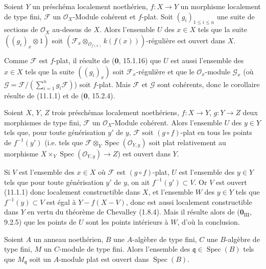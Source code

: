 \begin{corollary}[11.1.4]
\label{IV.11.1.4-fr}
Soient $Y$ un préschéma localement noethérien, $f:X\to Y$ un morphisme
localement de type fini, $\mathcal F$ un $\mathcal O_X$-Module cohérent et
$f$-plat. Soit $(g_i)_{1\leq i\leq n}$ une suite de sections de $\mathcal O_X$
au-dessus de $X$. Alors l'ensemble $U$ des $x\in X$ tels que la suite
$((g_i)_x\otimes1)$ soit
$(\mathcal F_x\otimes_{\mathcal O_{f(x)}}k(f(x)))$-régulière est ouvert dans
$X$.
\end{corollary}


Comme $\mathcal F$ est $f$-plat, il résulte de ($\mathbf 0$, 15.1.16) que $U$
est aussi l'ensemble des $x\in X$ tels que la suite $((g_i)_x)$ soit
$\mathcal F_x$-régulière et que le $\mathcal O_x$-module $\mathcal G_x$ (où
$\mathcal G=\mathcal F/(\sum_{i=1}^n g_i\mathcal F)$) soit $f$-plat. Mais
$\mathcal F$ et $\mathcal G$ sont cohérents, donc le corollaire résulte de
(11.1.1) et de ($\mathbf 0$, 15.2.4).

\begin{corollary}[11.1.5]
\label{IV.11.1.5-fr}
Soient $X$, $Y$, $Z$ trois préschémas localement noethériens,
$f:X\to Y$, $g:Y\to Z$ deux morphismes de type fini, $\mathcal F$ un
$\mathcal O_X$-Module cohérent. Alors l'ensemble $U$ des $y\in Y$ tels que,
pour toute générisation $y'$ de $y$, $\mathcal F$ soit $(g\circ f)$-plat en
tous les points de $f^{-1}(y')$ (i.e. tels que
$\mathcal F\otimes_Y\operatorname{Spec}(\mathcal O_{Y,y})$ soit plat
relativement au morphisme
$X\times_Y\operatorname{Spec}(\mathcal O_{Y,y})\to Z$) est ouvert dans $Y$.
\end{corollary}

Si $V$ est l'ensemble des $x\in X$ où $\mathcal F$ est $(g\circ f)$-plat, $U$
est l'ensemble des $y\in Y$ tels que pour toute générisation $y'$ de $y$, on
ait $f^{-1}(y')\subset V$. Or $V$ est ouvert (11.1.1) donc localement
constructible dans $X$, et l'ensemble $W$ des $y\in Y$ tels que
$f^{-1}(y)\subset V$ est égal à $Y-f(X-V)$, donc est aussi localement
constructible dans $Y$ en vertu du théorème de Chevalley (1.8.4). Mais il
résulte alors de ($\mathbf 0_{\mathrm{III}}$, 9.2.5) que les points de $U$ sont
les points intérieurs à $W$, d'où la conclusion.

\begin{corollary}[11.1.6]
\label{IV.11.1.6-fr}
Soient $A$ un anneau noethérien, $B$ une $A$-algèbre de type fini, $C$ une
$B$-algèbre de type fini, $M$ un $C$-module de type fini. Alors l'ensemble des
$\mathfrak q\in\operatorname{Spec}(B)$ tels que $M_{\mathfrak q}$ soit un
$A$-module plat est ouvert dans $\operatorname{Spec}(B)$.
\end{corollary}

